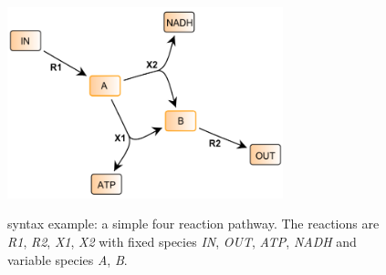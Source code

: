\begin{figure}[h]
  \centering
  \includegraphics[width=8cm]{examples/spec-example1.pdf}\\
  \caption{\FBC syntax example: a simple four reaction pathway. The reactions are \textit{R1}, \textit{R2}, \textit{X1}, \textit{X2} with fixed species \textit{IN}, \textit{OUT}, \textit{ATP}, \textit{NADH} and variable species \textit{A}, \textit{B}.}
  \label{fig:example1}
\end{figure}




